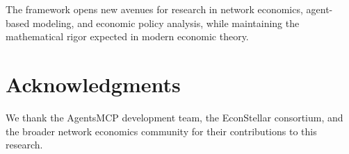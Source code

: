 \documentclass[12pt,a4paper]{article}
\begin{document}
The framework opens new avenues for research in network economics, agent-based modeling, and economic policy analysis, while maintaining the mathematical rigor expected in modern economic theory.

\section*{Acknowledgments}

We thank the AgentsMCP development team, the EconStellar consortium, and the broader network economics community for their contributions to this research.



\end{document}
